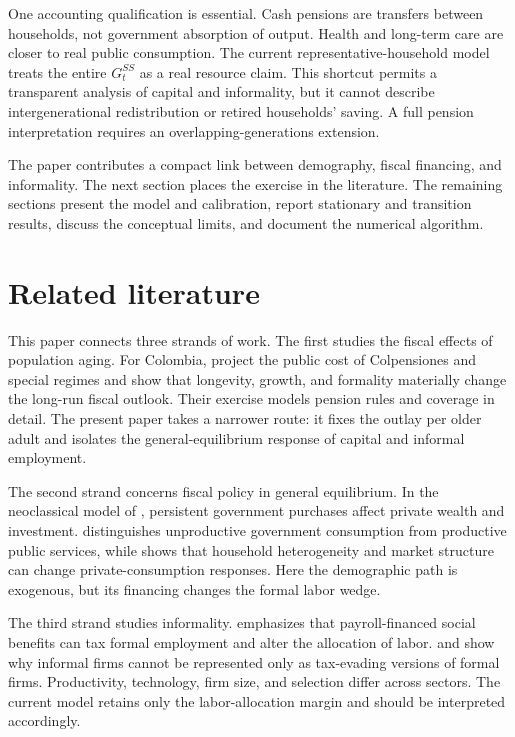 \documentclass[12pt]{article}
\begin{document}
One accounting qualification is essential. Cash pensions are transfers between
households, not government absorption of output. Health and long-term care are
closer to real public consumption. The current representative-household model
treats the entire $G_t^{SS}$ as a real resource claim. This shortcut permits a
transparent analysis of capital and informality, but it cannot describe
intergenerational redistribution or retired households' saving. A full pension
interpretation requires an overlapping-generations extension.

The paper contributes a compact link between demography, fiscal financing, and
informality. The next section places the exercise in the literature. The
remaining sections present the model and calibration, report stationary and
transition results, discuss the conceptual limits, and document the numerical
algorithm.

\section{Related literature}

This paper connects three strands of work. The first studies the fiscal effects
of population aging. For Colombia, \citet{Ospina2024} project the public cost of
Colpensiones and special regimes and show that longevity, growth, and formality
materially change the long-run fiscal outlook. Their exercise models pension
rules and coverage in detail. The present paper takes a narrower route: it
fixes the outlay per older adult and isolates the general-equilibrium response
of capital and informal employment.

The second strand concerns fiscal policy in general equilibrium. In the
neoclassical model of \citet{BaxterKing1993}, persistent government purchases
affect private wealth and investment. \citet{Barro1990} distinguishes
unproductive government consumption from productive public services, while
\citet{Gali2007} shows that household heterogeneity and market structure can
change private-consumption responses. Here the demographic path is exogenous,
but its financing changes the formal labor wedge.

The third strand studies informality. \citet{Levy2008} emphasizes that
payroll-financed social benefits can tax formal employment and alter the
allocation of labor. \citet{LaPortaShleifer2014} and \citet{Ulyssea2018} show
why informal firms cannot be represented only as tax-evading versions of
formal firms. Productivity, technology, firm size, and selection differ across
sectors. The current model retains only the labor-allocation margin and should
be interpreted accordingly.
\end{document}
